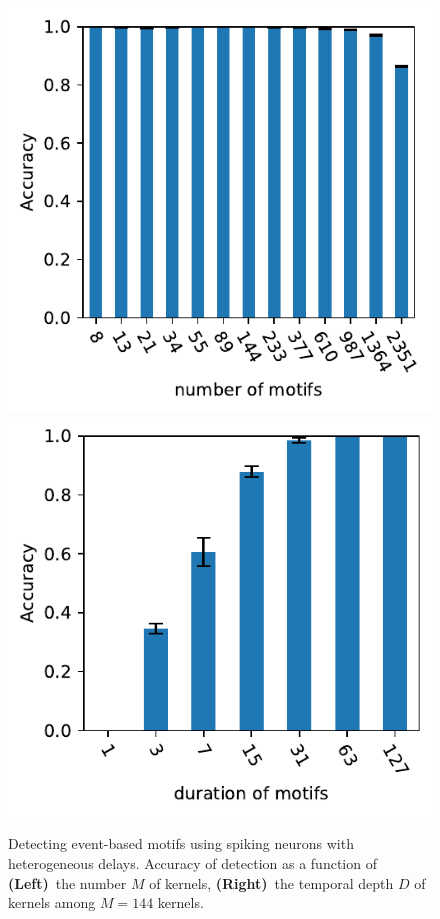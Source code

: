 \documentclass[runningheads]{llncs}
\begin{document}
\begin{figure}%
  \centering
  \includegraphics[width=0.480\linewidth]{figures/THC_N_PGs.pdf}
  \includegraphics[width=0.480\linewidth]{figures/THC_N_PG_time.pdf}
    \caption{Detecting event-based motifs using spiking neurons with heterogeneous delays. 
Accuracy of detection as a function of  {\bf (Left)}~the number $M$ of kernels, 
    {\bf (Right)}~the temporal depth $D$ of kernels among $M=144$ kernels.
    }
  \label{fig:model_results}
\end{figure}
\end{document}
